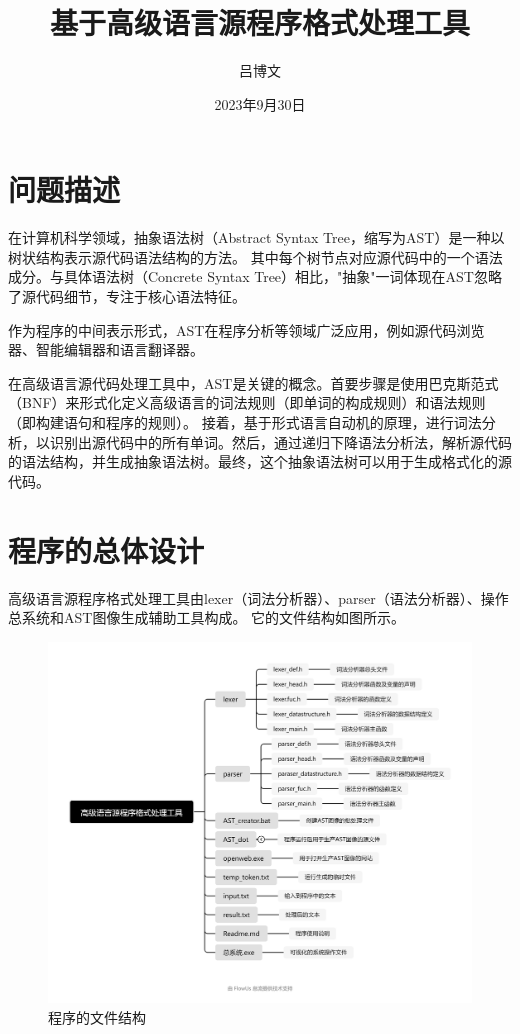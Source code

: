 \documentclass[supercite]{Experimental_Report}
\title{基于高级语言源程序格式处理工具}
\author{吕博文}
\date{2023年9月30日}
\theoremstyle{definition}
\begin{document}
\maketitle

\clearpage


\tableofcontents[level=2]

\clearpage


\section{问题描述}

在计算机科学领域，抽象语法树（Abstract Syntax Tree，缩写为AST）是一种以树状结构表示源代码语法结构的方法。
其中每个树节点对应源代码中的一个语法成分。与具体语法树（Concrete Syntax Tree）相比，"抽象"一词体现在AST忽略了源代码细节，专注于核心语法特征。

作为程序的中间表示形式，AST在程序分析等领域广泛应用，例如源代码浏览器、智能编辑器和语言翻译器。

在高级语言源代码处理工具中，AST是关键的概念。首要步骤是使用巴克斯范式（BNF）来形式化定义高级语言的词法规则（即单词的构成规则）和语法规则（即构建语句和程序的规则）。
接着，基于形式语言自动机的原理，进行词法分析，以识别出源代码中的所有单词。然后，通过递归下降语法分析法，解析源代码的语法结构，并生成抽象语法树。最终，这个抽象语法树可以用于生成格式化的源代码。

\newpage
\section{程序的总体设计}

高级语言源程序格式处理工具由lexer（词法分析器）、parser（语法分析器）、操作总系统和AST图像生成辅助工具构成。
它的文件结构如图所示。
\begin{figure}[htb]
	\begin{center}
		\includegraphics[scale=0.2]{images/高级语言源程序格式处理工具.png}
		\caption{程序的文件结构}
		\label{fig1-1}
	\end{center}
\end{figure}
\end{document}
